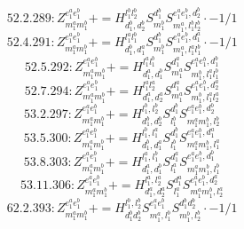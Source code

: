 \documentclass[letterpaper,10pt,fleqn,leqno,onecolumn]{article}
\begin{document}
\begin{equation} \;\;\;\;\;\;  52.2.289: Z^{e_{1}^{a}e_{1}^{b}}_{m_{1}^{a}m_{1}^{b}}+=H^{l_{1}^{b}l_{2}^{b}}_{d_{1}^{b},d_{2}^{b}}S^{d_{1}^{b}}_{m_{1}^{b}}S^{e_{1}^{a}e_{1}^{b},d_{2}^{b}}_{m_{1}^{a},l_{1}^{b}l_{2}^{b}}\cdot -1/1 \end{equation}
\begin{equation} \;\;\;\;\;\;  52.4.291: Z^{e_{1}^{a}e_{1}^{b}}_{m_{1}^{a}m_{1}^{b}}+=H^{l_{1}^{a}l_{1}^{b}}_{d_{1}^{b},d_{1}^{a}}S^{d_{1}^{b}}_{m_{1}^{b}}S^{e_{1}^{a}e_{1}^{b},d_{1}^{a}}_{m_{1}^{a},l_{1}^{a}l_{1}^{b}}\cdot -1/1 \end{equation}
\begin{equation} \;\;\;\;\;\;  52.5.292: Z^{e_{1}^{a}e_{1}^{b}}_{m_{1}^{a}m_{1}^{b}}+=H^{l_{1}^{a}l_{1}^{b}}_{d_{1}^{a},d_{1}^{b}}S^{d_{1}^{a}}_{m_{1}^{a}}S^{e_{1}^{a}e_{1}^{b},d_{1}^{b}}_{m_{1}^{b},l_{1}^{a}l_{1}^{b}} \end{equation}
\begin{equation} \;\;\;\;\;\;  52.7.294: Z^{e_{1}^{a}e_{1}^{b}}_{m_{1}^{a}m_{1}^{b}}+=H^{l_{1}^{a}l_{2}^{a}}_{d_{1}^{a},d_{2}^{a}}S^{d_{1}^{a}}_{m_{1}^{a}}S^{e_{1}^{a}e_{1}^{b},d_{2}^{a}}_{m_{1}^{b},l_{1}^{a}l_{2}^{a}} \end{equation}
\begin{equation} \;\;\;\;\;\;  53.2.297: Z^{e_{1}^{a}e_{1}^{b}}_{m_{1}^{a}m_{1}^{b}}+=H^{l_{1}^{b},l_{2}^{b}}_{d_{1}^{b},d_{2}^{b}}S^{d_{1}^{b}}_{l_{1}^{b}}S^{e_{1}^{a}e_{1}^{b},d_{2}^{b}}_{m_{1}^{a}m_{1}^{b},l_{2}^{b}} \end{equation}
\begin{equation} \;\;\;\;\;\;  53.5.300: Z^{e_{1}^{a}e_{1}^{b}}_{m_{1}^{a}m_{1}^{b}}+=H^{l_{1}^{b},l_{1}^{a}}_{d_{1}^{b},d_{1}^{a}}S^{d_{1}^{b}}_{l_{1}^{b}}S^{e_{1}^{a}e_{1}^{b},d_{1}^{a}}_{m_{1}^{a}m_{1}^{b},l_{1}^{a}} \end{equation}
\begin{equation} \;\;\;\;\;\;  53.8.303: Z^{e_{1}^{a}e_{1}^{b}}_{m_{1}^{a}m_{1}^{b}}+=H^{l_{1}^{a},l_{1}^{b}}_{d_{1}^{a},d_{1}^{b}}S^{d_{1}^{a}}_{l_{1}^{a}}S^{e_{1}^{a}e_{1}^{b},d_{1}^{b}}_{m_{1}^{a}m_{1}^{b},l_{1}^{b}} \end{equation}
\begin{equation} \;\;\;\;\;\;  53.11.306: Z^{e_{1}^{a}e_{1}^{b}}_{m_{1}^{a}m_{1}^{b}}+=H^{l_{1}^{a},l_{2}^{a}}_{d_{1}^{a},d_{2}^{a}}S^{d_{1}^{a}}_{l_{1}^{a}}S^{e_{1}^{a}e_{1}^{b},d_{2}^{a}}_{m_{1}^{a}m_{1}^{b},l_{2}^{a}} \end{equation}
\begin{equation} \;\;\;\;\;\;  62.2.393: Z^{e_{1}^{a}e_{1}^{b}}_{m_{1}^{a}m_{1}^{b}}+=H^{l_{1}^{b},l_{2}^{b}}_{d_{1}^{b}d_{2}^{b}}S^{e_{1}^{a}e_{1}^{b}}_{m_{1}^{a},l_{1}^{b}}S^{d_{1}^{b}d_{2}^{b}}_{m_{1}^{b},l_{2}^{b}}\cdot -1/1 \end{equation}
\end{document}
